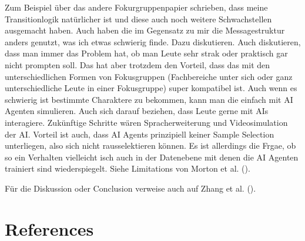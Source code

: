 \documentclass[
  letterpaper,
  DIV=11,
  numbers=noendperiod]{scrartcl}
\begin{document}
Zum Beispiel über das andere Fokurgruppenpapier schrieben, dass meine
Transitionlogik natürlicher ist und diese auch noch weitere
Schwachstellen ausgemacht haben. Auch haben die im Gegensatz zu mir die
Messagestruktur anders genutzt, was ich etwas schwierig finde. Dazu
diskutieren. Auch diskutieren, dass man immer das Problem hat, ob man
Leute sehr strak oder praktisch gar nicht prompten soll. Das hat aber
trotzdem den Vorteil, dass das mit den unterschiedlichen Formen von
Fokusgruppen (Fachbereiche unter sich oder ganz unterschiedliche Leute
in einer Fokusgruppe) super kompatibel ist. Auch wenn es schwierig ist
bestimmte Charaktere zu bekommen, kann man die einfach mit AI Agenten
simulieren. Auch sich darauf beziehen, dass Leute gerne mit AIs
interagiere. Zukünftige Schritte wären Spracherweiterung und
Videosimulation der AI. Vorteil ist auch, dass AI Agents prinzipiell
keiner Sample Selection unterliegen, also sich nicht rausselektieren
können. Es ist allerdings die Frgae, ob so ein Verhalten vielleicht isch
auch in der Datenebene mit denen die AI Agenten trainiert sind
wiederspiegelt. Siehe Limitations von Morton et al.
().

Für die Diskussion oder Conclusion verweise auch auf Zhang et al.
().

\section*{References}\label{sec:references}
\end{document}
